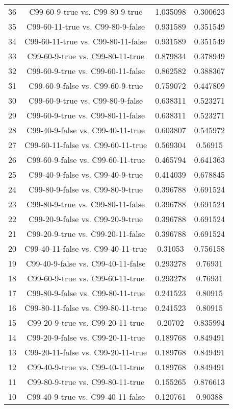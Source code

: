 \documentclass[a4paper,10pt]{article}
\begin{document}
\begin{landscape}
\begin{table}[!htp]
\begin{tabular}{cccc}
36&C99-60-9-true vs. C99-80-9-true&1.035098&0.300623\\
35&C99-60-11-true vs. C99-80-9-false&0.931589&0.351549\\
34&C99-60-11-true vs. C99-80-11-false&0.931589&0.351549\\
33&C99-60-9-true vs. C99-80-11-true&0.879834&0.378949\\
32&C99-60-9-true vs. C99-60-11-false&0.862582&0.388367\\
31&C99-60-9-false vs. C99-60-9-true&0.759072&0.447809\\
30&C99-60-9-true vs. C99-80-9-false&0.638311&0.523271\\
29&C99-60-9-true vs. C99-80-11-false&0.638311&0.523271\\
28&C99-40-9-false vs. C99-40-11-true&0.603807&0.545972\\
27&C99-60-11-false vs. C99-60-11-true&0.569304&0.56915\\
26&C99-60-9-false vs. C99-60-11-true&0.465794&0.641363\\
25&C99-40-9-false vs. C99-40-9-true&0.414039&0.678845\\
24&C99-80-9-false vs. C99-80-9-true&0.396788&0.691524\\
23&C99-80-9-true vs. C99-80-11-false&0.396788&0.691524\\
22&C99-20-9-false vs. C99-20-9-true&0.396788&0.691524\\
21&C99-20-9-true vs. C99-20-11-false&0.396788&0.691524\\
20&C99-40-11-false vs. C99-40-11-true&0.31053&0.756158\\
19&C99-40-9-false vs. C99-40-11-false&0.293278&0.76931\\
18&C99-60-9-true vs. C99-60-11-true&0.293278&0.76931\\
17&C99-80-9-false vs. C99-80-11-true&0.241523&0.80915\\
16&C99-80-11-false vs. C99-80-11-true&0.241523&0.80915\\
15&C99-20-9-true vs. C99-20-11-true&0.20702&0.835994\\
14&C99-20-9-false vs. C99-20-11-true&0.189768&0.849491\\
13&C99-20-11-false vs. C99-20-11-true&0.189768&0.849491\\
12&C99-40-9-true vs. C99-40-11-true&0.189768&0.849491\\
11&C99-80-9-true vs. C99-80-11-true&0.155265&0.876613\\
10&C99-40-9-true vs. C99-40-11-false&0.120761&0.90388\\

\end{tabular}
\end{table}
\end{landscape}
\end{document}
